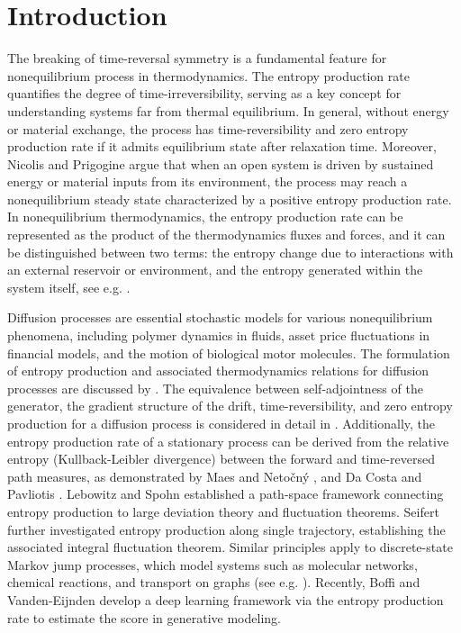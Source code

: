 \documentclass[10pt]{article}
\theoremstyle{definition}
\theoremstyle{remark}
\numberwithin{equation}{section}
\begin{document}
\section{Introduction}

The breaking of time-reversal symmetry is a fundamental feature for nonequilibrium process in thermodynamics.
The entropy production rate quantifies the degree of time-irreversibility, serving as a key concept for understanding systems far from thermal equilibrium. 
In general, without energy or material exchange, the process has time-reversibility and zero entropy production rate if it admits equilibrium state after relaxation time.
Moreover, Nicolis and Prigogine \cite{NP77} argue that when an open system is driven by sustained energy or material inputs from its environment, the process may reach a nonequilibrium steady state characterized by a positive entropy production rate.
In nonequilibrium thermodynamics, the entropy production rate can be represented as the product of the thermodynamics fluxes and forces, 
and it can be distinguished between two terms: the entropy change due to interactions with an external reservoir or environment, and the entropy generated within the system itself, see e.g. \cite{DM62, NP77}. 

Diffusion processes are essential stochastic models for various nonequilibrium phenomena, including polymer dynamics in fluids, asset price fluctuations in financial models, and the motion of biological motor molecules.
The formulation of entropy production and associated thermodynamics relations for diffusion processes are discussed by \cite{GQ10,VE10, TD12}. 
The equivalence between self-adjointness of the generator, the gradient structure of the drift, time-reversibility, and zero entropy production for a diffusion process is considered in detail in \cite{JQQ04,QQT02,MRV02}. Additionally, the entropy production rate of a stationary process can be derived from the relative entropy (Kullback-Leibler divergence) between the forward and time-reversed path measures, as demonstrated by Maes and Netočný \cite{MN03}, and Da Costa and Pavliotis \cite{DP23}. 
Lebowitz and Spohn \cite{LS99} established a path-space framework connecting entropy production to large deviation theory and fluctuation theorems.
Seifert \cite{S05} further investigated entropy production along single trajectory, establishing the associated integral fluctuation theorem. Similar principles apply to discrete-state Markov jump processes, which model systems such as molecular networks, chemical reactions, and transport on graphs (see e.g. \cite{EV10, MNW08}). Recently, Boffi and Vanden-Eijnden \cite{BV24} develop a deep learning framework via the entropy production rate to estimate the score in generative modeling.
\end{document}
